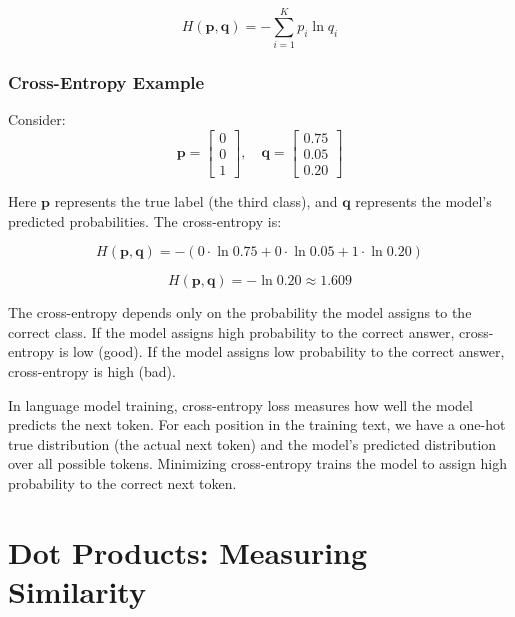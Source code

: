 \documentclass{book}
\begin{document}
\begin{equation}
H(\mathbf{p}, \mathbf{q}) = -\sum_{i=1}^{K} p_i \ln q_i
\end{equation}

\subsubsection{Cross-Entropy Example}

Consider:
\begin{equation}
\mathbf{p} = \begin{bmatrix} 0 \\ 0 \\ 1 \end{bmatrix}, \quad
\mathbf{q} = \begin{bmatrix} 0.75 \\ 0.05 \\ 0.20 \end{bmatrix}
\end{equation}

Here $\mathbf{p}$ represents the true label (the third class), and $\mathbf{q}$ represents the model's predicted probabilities. The cross-entropy is:

\begin{equation}
H(\mathbf{p}, \mathbf{q}) = -(0 \cdot \ln 0.75 + 0 \cdot \ln 0.05 + 1 \cdot \ln 0.20)
\end{equation}

\begin{equation}
H(\mathbf{p}, \mathbf{q}) = -\ln 0.20 \approx 1.609
\end{equation}

The cross-entropy depends only on the probability the model assigns to the correct class. If the model assigns high probability to the correct answer, cross-entropy is low (good). If the model assigns low probability to the correct answer, cross-entropy is high (bad).

In language model training, cross-entropy loss measures how well the model predicts the next token. For each position in the training text, we have a one-hot true distribution (the actual next token) and the model's predicted distribution over all possible tokens. Minimizing cross-entropy trains the model to assign high probability to the correct next token.

\section{Dot Products: Measuring Similarity}
\end{document}
